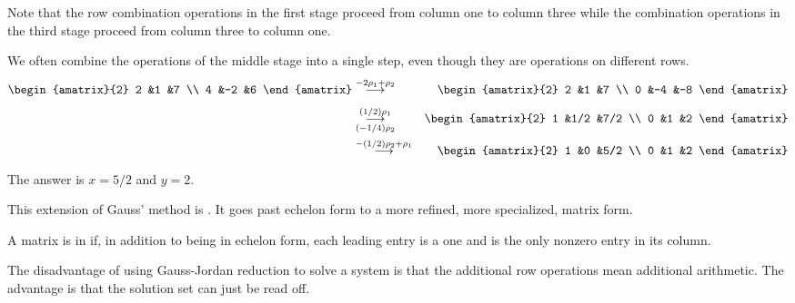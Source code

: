 Note that the row combination operations in the first stage proceed from column
one to column three while the combination operations in the third stage proceed 
from column three to column one.

\begin{example}
We often combine the operations of the middle stage into a single step,
even though they are operations on different rows.
\begin{eqnarray*}
    \begin{amatrix}{2}
       2   &1   &7   \\
       4   &-2  &6
    \end{amatrix}
  &\grstep{-2\rho_1+\rho_2}
  &\begin{amatrix}{2}
       2   &1   &7   \\
       0   &-4  &-8
    \end{amatrix}                                   \\
  &\grstep[(-1/4)\rho_2]{(1/2)\rho_1}
  &\begin{amatrix}{2}
       1   &1/2   &7/2   \\
       0   &1     &2
    \end{amatrix}                                    \\
  &\grstep{-(1/2)\rho_2+\rho_1}
  &\begin{amatrix}{2}
       1   &0   &5/2   \\
       0   &1   &2
    \end{amatrix}
\end{eqnarray*}
The answer is $x=5/2$ and $y=2$.
\end{example}

This extension of Gauss' method is 
.
It goes past echelon form to a more refined, more specialized,
matrix form.

\begin{definition}\label{def:RedEchForm}
A matrix is in
if, in addition to being in echelon form, each leading entry is a
one and is the only nonzero entry in its column.
\end{definition}

\noindent
The disadvantage of using Gauss-Jordan reduction to solve a system is that
the additional row operations mean additional arithmetic.
The advantage is that the solution set can just be read off.

